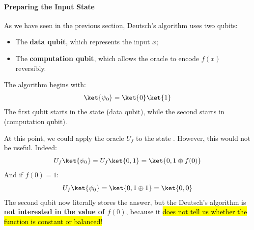 \paragraph{Preparing the Input State}\label{ex:preparing-the-input-state}

As we have seen in the previous section, Deutsch's algorithm uses two qubits:
\begin{itemize}
    \item The \textbf{data qubit}, which represents the input $x$;
    \item The \textbf{computation qubit}, which allows the oracle to encode $f(x)$ reversibly.
\end{itemize}
The algorithm begins with:
\begin{equation*}
    \ket{\psi_0} = \ket{0}\ket{1}
\end{equation*}
The first qubit starts in the state  (data qubit), while the second starts in  (computation qubit).

\highspace
\textcolor{Red2}{} At this point, we could apply the oracle $U_f$ to the state . However, this would not be useful. Indeed:
\begin{equation*}
    U_f \ket{\psi_0} = U_f \ket{0, 1} = \ket{0, 1 \oplus f(0)}
\end{equation*}
And if $f(0) = 1$:
\begin{equation*}
    U_f \ket{\psi_0} = \ket{0, 1 \oplus 1} = \ket{0, 0}
\end{equation*}
The second qubit now literally stores the answer, but the Deutsch's algorithm is \textbf{not interested in the value of $f(0)$}, because it \hl{does not tell us whether the function is constant or balanced!}

